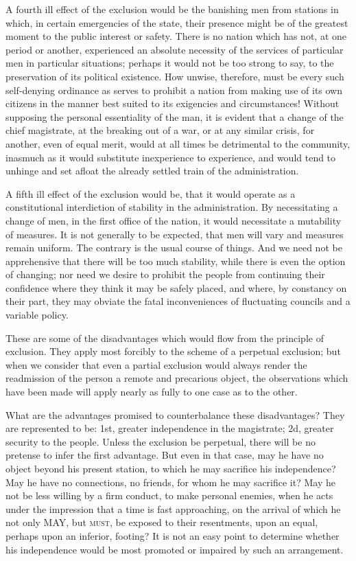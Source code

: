 A fourth ill effect of the exclusion would be the banishing men from stations in which, in certain emergencies of the state, their presence might be of the greatest moment to the public interest or safety. 
There is no nation which has not, at one period or another, experienced an absolute necessity of the services of particular men in particular situations; perhaps it would not be too strong to say, to the preservation of its political existence. 
How unwise, therefore, must be every such self-denying ordinance as serves to prohibit a nation from making use of its own citizens in the manner best suited to its exigencies and circumstances! 
Without supposing the personal essentiality of the man, it is evident that a change of the chief magistrate, at the breaking out of a war, or at any similar crisis, for another, even of equal merit, would at all times be detrimental to the community, inasmuch as it would substitute inexperience to experience, and would tend to unhinge and set afloat the already settled train of the administration.

A fifth ill effect of the exclusion would be, that it would operate as a constitutional interdiction of stability in the administration. 
By necessitating a change of men, in the first office of the nation, it would necessitate a mutability of measures. 
It is not generally to be expected, that men will vary and measures remain uniform. 
The contrary is the usual course of things. 
And we need not be apprehensive that there will be too much stability, while there is even the option of changing; nor need we desire to prohibit the people from continuing their confidence where they think it may be safely placed, and where, by constancy on their part, they may obviate the fatal inconveniences of fluctuating councils and a variable policy.

These are some of the disadvantages which would flow from the principle of exclusion. 
They apply most forcibly to the scheme of a perpetual exclusion; but when we consider that even a partial exclusion would always render the readmission of the person a remote and precarious object, the observations which have been made will apply nearly as fully to one case as to the other.

What are the advantages promised to counterbalance these disadvantages? 
They are represented to be: 1st, greater independence in the magistrate; 2d, greater security to the people. 
Unless the exclusion be perpetual, there will be no pretense to infer the first advantage. 
But even in that case, may he have no object beyond his present station, to which he may sacrifice his independence? 
May he have no connections, no friends, for whom he may sacrifice it? 
May he not be less willing by a firm conduct, to make personal enemies, when he acts under the impression that a time is fast approaching, on the arrival of which he not only MAY, but \textsc{must}, be exposed to their resentments, upon an equal, perhaps upon an inferior, footing? 
It is not an easy point to determine whether his independence would be most promoted or impaired by such an arrangement.


